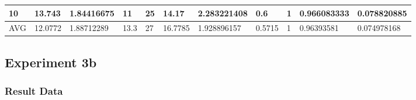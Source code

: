 \begin{table}[H]
\begin{adjustbox}{max width=380pt,keepaspectratio,angle=90}
\begin{tabular}{|l|l|l|l|l|l|l|l|l|l|l|}
					10         & 13.743     & 1.84416675  & 11         & 25         & 14.17      & 2.283221408 & 0.6         & 1           & 0.966083333 & 0.078820885 \\ \hline
					AVG        & 12.0772    & 1.88712289  & 13.3       & 27         & 16.7785    & 1.928896157 & 0.5715      & 1           & 0.96393581  & 0.074978168 \\ \hline
				\end{tabular}
			\end{adjustbox}	
		\end{table}

	\subsection{Experiment 3b}
	\label{sec:A_Exp3b}
		\subsubsection{Result Data}
		\label{sec:A_Exp3b_Data}
